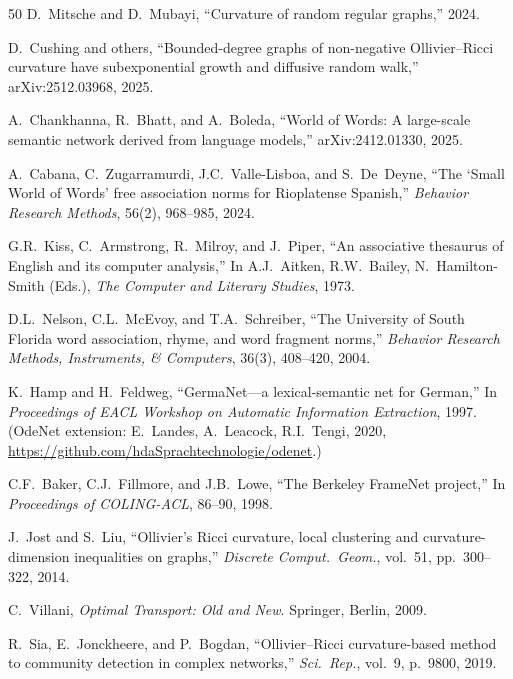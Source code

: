 \documentclass[11pt,a4paper]{article}
\begin{document}
\begin{thebibliography}{50}
D.~Mitsche and D.~Mubayi, ``Curvature of random regular graphs,'' 2024.

D.~Cushing and others, ``Bounded-degree graphs of non-negative Ollivier--Ricci curvature have subexponential growth and diffusive random walk,'' arXiv:2512.03968, 2025.

A.~Chankhanna, R.~Bhatt, and A.~Boleda, ``World of Words: A large-scale semantic network derived from language models,'' arXiv:2412.01330, 2025.

A.~Cabana, C.~Zugarramurdi, J.C.~Valle-Lisboa, and S.~De~Deyne, ``The `Small World of Words' free association norms for Rioplatense Spanish,'' \textit{Behavior Research Methods}, 56(2), 968--985, 2024.

G.R.~Kiss, C.~Armstrong, R.~Milroy, and J.~Piper, ``An associative thesaurus of English and its computer analysis,'' In A.J.~Aitken, R.W.~Bailey, N.~Hamilton-Smith (Eds.), \textit{The Computer and Literary Studies}, 1973.

D.L.~Nelson, C.L.~McEvoy, and T.A.~Schreiber, ``The University of South Florida word association, rhyme, and word fragment norms,'' \textit{Behavior Research Methods, Instruments, \& Computers}, 36(3), 408--420, 2004.

K.~Hamp and H.~Feldweg, ``GermaNet---a lexical-semantic net for German,'' In \textit{Proceedings of EACL Workshop on Automatic Information Extraction}, 1997.
(OdeNet extension: E.~Landes, A.~Leacock, R.I.~Tengi, 2020, \url{https://github.com/hdaSprachtechnologie/odenet}.)

C.F.~Baker, C.J.~Fillmore, and J.B.~Lowe, ``The Berkeley FrameNet project,'' In \textit{Proceedings of COLING-ACL}, 86--90, 1998.

J.~Jost and S.~Liu, ``Ollivier's Ricci curvature, local clustering and curvature-dimension inequalities on graphs,'' \emph{Discrete Comput.\ Geom.}, vol.~51, pp.~300--322, 2014.

C.~Villani, \emph{Optimal Transport: Old and New}. Springer, Berlin, 2009.

R.~Sia, E.~Jonckheere, and P.~Bogdan, ``Ollivier--Ricci curvature-based method to community detection in complex networks,'' \emph{Sci.~Rep.}, vol.~9, p.~9800, 2019.


\end{thebibliography}
\end{document}
